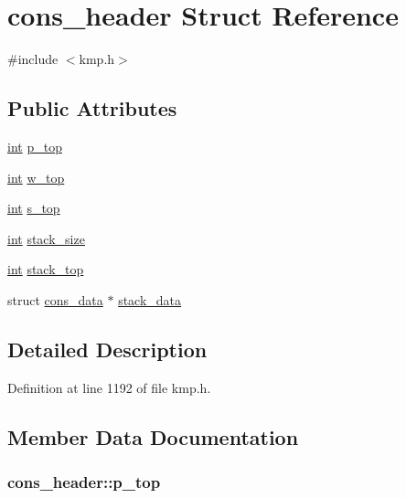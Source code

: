 \hypertarget{structcons__header}{\section{cons\-\_\-header Struct Reference}
\label{structcons__header}
}


{\ttfamily \#include $<$kmp.\-h$>$}

\subsection*{Public Attributes}
\begin{DoxyCompactItemize}
\item 
\hyperlink{ittnotify__static_8h_a8b8dcd723308a8cb5d84277c7a3fff70}{int} \hyperlink{structcons__header_ab7848b2de23e2736c18ae9d5af741760}{p\-\_\-top}
\item 
\hyperlink{ittnotify__static_8h_a8b8dcd723308a8cb5d84277c7a3fff70}{int} \hyperlink{structcons__header_ac4dd32db9b0ccf46f318bb61260a8d67}{w\-\_\-top}
\item 
\hyperlink{ittnotify__static_8h_a8b8dcd723308a8cb5d84277c7a3fff70}{int} \hyperlink{structcons__header_acaf8577c3c1f0a0b0aa18b29ce426b30}{s\-\_\-top}
\item 
\hyperlink{ittnotify__static_8h_a8b8dcd723308a8cb5d84277c7a3fff70}{int} \hyperlink{structcons__header_a1ecba36b94cb90347492ca2077dbea33}{stack\-\_\-size}
\item 
\hyperlink{ittnotify__static_8h_a8b8dcd723308a8cb5d84277c7a3fff70}{int} \hyperlink{structcons__header_a264d80e923a0a4babc16d0ab3672ca31}{stack\-\_\-top}
\item 
struct \hyperlink{structcons__data}{cons\-\_\-data} $\ast$ \hyperlink{structcons__header_ad85d65edead496f21419376e08bc6e20}{stack\-\_\-data}
\end{DoxyCompactItemize}


\subsection{Detailed Description}


Definition at line 1192 of file kmp.\-h.



\subsection{Member Data Documentation}
\hypertarget{structcons__header_ab7848b2de23e2736c18ae9d5af741760}{
\subsubsection[{p\-\_\-top}]{ cons\-\_\-header\-::p\-\_\-top}}\label{structcons__header_ab7848b2de23e2736c18ae9d5af741760}


